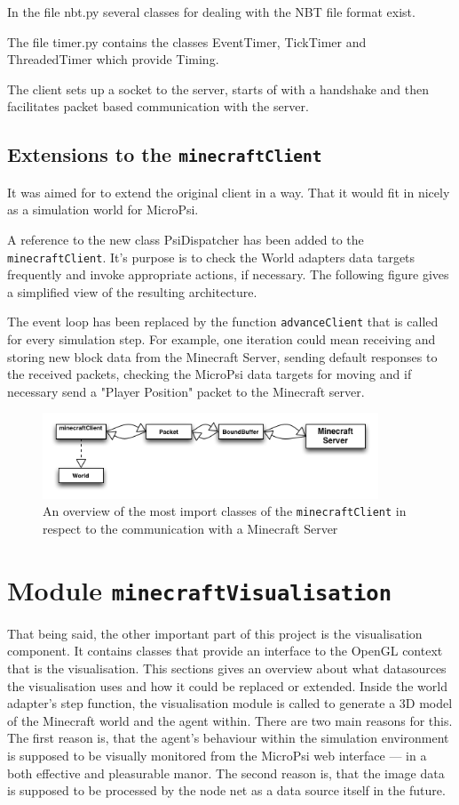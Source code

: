 In the file nbt.py several classes for dealing with the NBT file format exist.

The file timer.py contains the classes EventTimer, TickTimer and ThreadedTimer which provide Timing.

The client sets up a socket to the server, starts of with a handshake and then facilitates packet based communication with the server.

        \subsection{Extensions to the \texttt{minecraftClient}}
It was aimed for to extend the original client in a way. That it would fit in nicely as a simulation world for MicroPsi.
        
A reference to the new class PsiDispatcher has been added to the \texttt{minecraftClient}. It's purpose is to check the World adapters data targets frequently and invoke appropriate actions, if necessary. The following figure gives a simplified view of the resulting architecture.

The event loop has been replaced by the function \texttt{advanceClient} that is called for every simulation step. For example, one iteration could mean receiving and storing new block data from the Minecraft Server, sending default responses to the received packets, checking the MicroPsi data targets for moving and if necessary send a "Player Position" packet to the Minecraft server.

\begin{figure}[h]
  \centering
    \includegraphics[width=10cm]{graphics/spock_overview}
  \caption{An overview of the most import classes of the \texttt{minecraftClient} in respect to the communication with a Minecraft Server}
  \label{spock_overview}
\end{figure}

    \section{Module \texttt{minecraftVisualisation}}
That being said, the other important part of this project is the visualisation component. It contains classes that provide an interface to the OpenGL context that is the visualisation. This sections gives an overview about what datasources the visualisation uses and how it could be replaced or extended. Inside the world adapter's step function, the visualisation module is called to generate a 3D model of the Minecraft world and the agent within. There are two main reasons for this. The first reason is, that the agent's behaviour within the simulation environment is supposed to be visually monitored from the MicroPsi web interface --- in a both effective and pleasurable manor. The second reason is, that the image data is supposed to be processed by the node net as a data source itself in the future.

